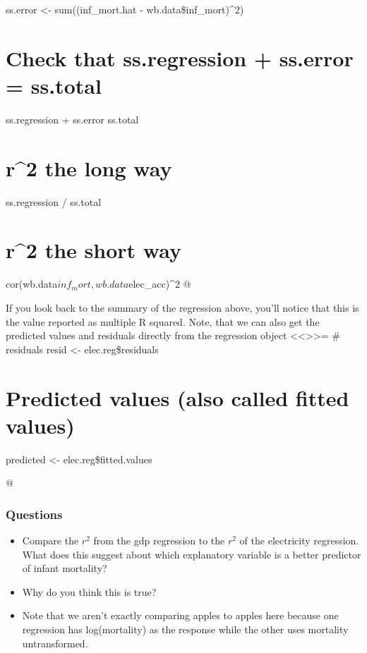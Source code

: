 \documentclass[
]{article}
\begin{document}
ss.error \textless- sum((inf\_mort.hat - wb.data\$inf\_mort)\^{}2)

\hypertarget{check-that-ss.regression-ss.error-ss.total}{%
\section{Check that ss.regression + ss.error =
ss.total}\label{check-that-ss.regression-ss.error-ss.total}}

ss.regression + ss.error ss.total

\hypertarget{r2-the-long-way}{%
\section{r\^{}2 the long way}\label{r2-the-long-way}}

ss.regression / ss.total

\hypertarget{r2-the-short-way}{%
\section{r\^{}2 the short way}\label{r2-the-short-way}}

cor(wb.data\(inf_mort, wb.data\)elec\_acc)\^{}2 @

If you look back to the summary of the regression above, you'll notice
that this is the value reported as multiple R squared. Note, that we can
also get the predicted values and residuals directly from the regression
object \textless\textless\textgreater\textgreater= \# residuals resid
\textless- elec.reg\$residuals

\hypertarget{predicted-values-also-called-fitted-values}{%
\section{Predicted values (also called fitted
values)}\label{predicted-values-also-called-fitted-values}}

predicted \textless- elec.reg\$fitted.values

@

\subsubsection*{Questions}
\begin{itemize}
\item Compare the $r^2$ from the gdp regression to the $r^2$ of the electricity regression. What does this suggest about which explanatory variable is a better predictor of infant mortality? 
\item Why do you think this is true?
\item Note that we aren't exactly comparing apples to apples here because one regression has log(mortality) as the response while the other uses mortality untransformed.
\end{itemize}
\end{document}
